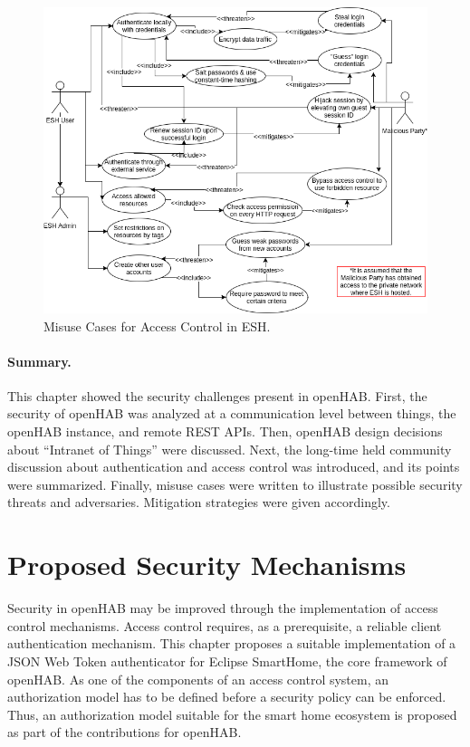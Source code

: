 \documentclass[12pt]{article}
\begin{document}
\begin{figure} [ht] 
\begin{center}
\includegraphics[width=\textwidth]{esh_misuse_cases}
\caption{Misuse Cases for Access Control in ESH.}
\label{fig:misuse_cases}
\end{center}
\end{figure}

\paragraph{Summary.} This chapter showed the security challenges present in openHAB. First, the security of openHAB was analyzed at a communication level between things, the openHAB instance, and remote REST APIs. Then, openHAB design decisions about ``Intranet of Things'' were discussed. Next, the long-time held community discussion about authentication and access control was introduced, and its points were summarized. Finally, misuse cases were written to illustrate possible security threats and adversaries. Mitigation strategies were given accordingly. 

\newpage
\section{Proposed Security Mechanisms}
\label{sec:mechanisms}
Security in openHAB may be improved through the implementation of access control mechanisms. Access control requires, as a prerequisite, a reliable client authentication mechanism. This chapter proposes a suitable implementation of a JSON Web Token authenticator for Eclipse SmartHome, the core framework of openHAB. As one of the components of an access control system, an authorization model has to be defined before a security policy can be enforced. Thus, an authorization model suitable for the smart home ecosystem is proposed as part of the contributions for openHAB.
\end{document}
